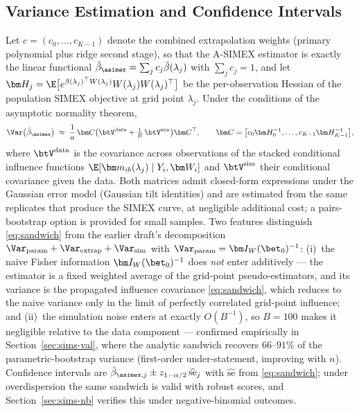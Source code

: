 \subsection{Variance Estimation and Confidence Intervals}\label{sec:var}

Let $c=(c_0,\dots,c_{K-1})$ denote the combined extrapolation weights
(primary polynomial plus ridge second stage), so that the A-SIMEX
estimator is exactly the linear functional
$\hat\beta_{\asimex}=\sum_jc_j\bar\beta(\lambda_j)$ with
$\sum_jc_j=1$, and let
$\bm H_j=\E\bigl[e^{\beta(\lambda_j)^\top W(\lambda_j)}
W(\lambda_j)W(\lambda_j)^\top\bigr]$ be the per-observation Hessian of
the population SIMEX objective at grid point $\lambda_j$. Under the
conditions of the asymptotic normality theorem,
\begin{equation}\label{eq:sandwich}
  \Var\bigl(\hat\beta_{\asimex}\bigr)\;\approx\;\frac1n\,\bm C
  \bigl(\btV^{\mathrm{data}}+\tfrac1B\,\btV^{\mathrm{sim}}\bigr)
  \bm C^\top,
  \qquad
  \bm C=\bigl[c_0\bm H_0^{-1},\dots,c_{K-1}\bm H_{K-1}^{-1}\bigr],
\end{equation}
where $\btV^{\mathrm{data}}$ is the covariance across observations of
the stacked conditional influence functions
$\E[\bm m_{ib}(\lambda_j)\mid Y_i,\bm W_i]$ and
$\btV^{\mathrm{sim}}$ their conditional covariance given the data.
Both matrices admit closed-form expressions under the Gaussian error
model (Gaussian tilt identities) and are estimated from the same
replicates that produce the SIMEX curve, at negligible additional
cost; a pairs-bootstrap option is provided for small samples. Two
features distinguish \eqref{eq:sandwich} from the earlier draft's
decomposition $\Var_{\mathrm{param}}+\Var_{\mathrm{extrap}}
+\Var_{\mathrm{sim}}$ with $\Var_{\mathrm{param}}
=\bm I_W(\bet_0)^{-1}$: (i)~the naive Fisher information
$\bm I_W(\bet_0)^{-1}$ does \emph{not} enter additively --- the
estimator is a fixed weighted average of the grid-point
pseudo-estimators, and its variance is the propagated influence
covariance \eqref{eq:sandwich}, which reduces to the naive variance
only in the limit of perfectly correlated grid-point influence; and
(ii)~the simulation noise enters at exactly $O(B^{-1})$, so $B=100$
makes it negligible relative to the data component --- confirmed
empirically in Section~\ref{sec:sims-val}, where the analytic sandwich
recovers $66$--$91\%$ of the parametric-bootstrap variance
(first-order under-statement, improving with $n$). Confidence
intervals are $\hat\beta_{\asimex,j}\pm
z_{1-\alpha/2}\,\widehat{\mathrm{se}}_j$ with
$\widehat{\mathrm{se}}$ from \eqref{eq:sandwich}; under
overdispersion the same sandwich is valid with robust scores, and
Section~\ref{sec:sims-nb} verifies this under negative-binomial
outcomes.

